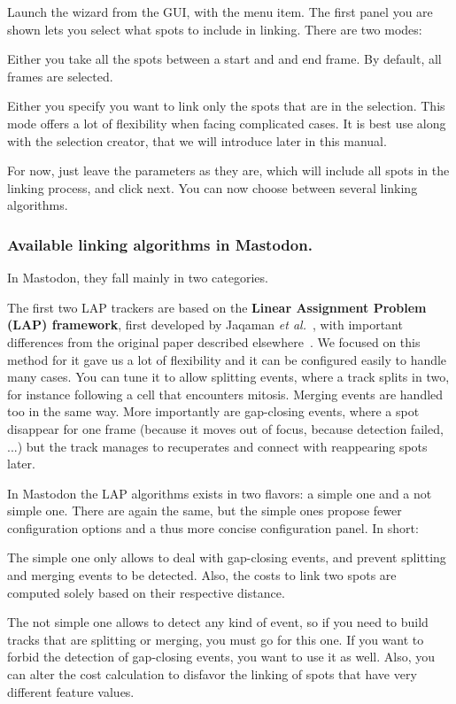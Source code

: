 Launch the wizard from the GUI, with the  menu item. 
The first panel you are shown lets you select what spots to include in linking. 
There are two modes:
\begin{myitemize}
    \item Either you take all the spots between a start and and end frame. By default, all frames are selected.
    \item Either you specify you want to link only the spots that are in the selection. 
    This mode offers a lot of flexibility when facing complicated cases. 
    It is best use along with the selection creator, that we will introduce later in this manual.
\end{myitemize}
For now, just leave the parameters as they are, which will include all spots in the linking process, and click next.
You can now choose between several linking algorithms. 

\subsubsection{Available linking algorithms in Mastodon.}

In Mastodon, they fall mainly in two categories.

The first two LAP trackers are based on the \textbf{Linear Assignment Problem (LAP) framework}, first developed by Jaqaman \textit{et al.}~\cite{Jaqaman2008}, with important differences from the original paper described elsewhere~\cite{TrackMate}. We focused on this method for it gave us a lot of flexibility and it can be configured easily to handle many cases. You can tune it to allow splitting events, where a track splits in two, for instance following a cell that encounters mitosis. Merging events are handled too in the same way. More importantly are gap-closing events, where a spot disappear for one frame (because it moves out of focus, because detection failed, ...) but the track manages to recuperates and connect with reappearing spots later.

In Mastodon the LAP algorithms exists in two flavors: a simple one and a not simple one. There are again the same, but the simple ones propose fewer configuration options and a thus more concise configuration panel. In short:
\begin{myitemize}
    \item The simple one only allows to deal with gap-closing events, and prevent splitting and merging events to be detected. Also, the costs to link two spots are computed solely based on their respective distance.
    
    \item The not simple one allows to detect any kind of event, so if you need to build tracks that are splitting or merging, you must go for this one. If you want to forbid the detection of gap-closing events, you want to use it as well. Also, you can alter the cost calculation to disfavor the linking of spots that have very different feature values.
\end{myitemize}

